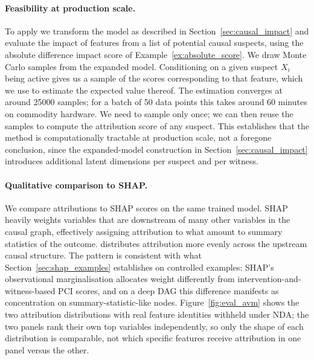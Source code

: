 \paragraph{Feasibility at production scale.}
To apply \ourapproach we transform the model as described in
Section~\ref{sec:causal_impact} and evaluate the impact of features from a list of
potential causal suspects, using the absolute difference impact score of
Example~\ref{ex:absolute_score}. We draw Monte Carlo samples from the expanded model.
Conditioning on a given suspect $X_i$ being active gives us a sample of the scores
corresponding to that feature, which we use to estimate the expected value thereof. The
estimation converges at around \num{25000} samples; for a batch of 50 data points this
takes around 60 minutes on commodity hardware. We need to sample only once; we can then reuse the samples to compute the
attribution score of any suspect. This
establishes that the method is computationally tractable at production scale, not a
foregone conclusion, since the expanded-model construction in
Section~\ref{sec:causal_impact} introduces additional latent dimensions per suspect and
per witness.

\paragraph{Qualitative comparison to SHAP.}
We compare \ourapproach attributions to SHAP scores \citep{lundberg2017unified} on the
same trained model. SHAP heavily weights variables that are downstream of many other
variables in the causal graph, effectively assigning attribution to what amount to
summary statistics of the outcome. \ourapproach distributes attribution more evenly
across the upstream causal structure. The pattern is consistent with what
Section~\ref{sec:shap_examples} establishes on controlled examples: SHAP's observational
marginalisation allocates weight differently from intervention-and-witness-based PCI
scores, and on a deep DAG this difference manifests as concentration on
summary-statistic-like nodes. Figure~\ref{fig:eval_avm} shows the two attribution
distributions with real feature identities withheld under NDA; the two panels
rank their own top variables independently, so only the shape of each
distribution is comparable, not which specific features receive attribution in
one panel versus the other.


